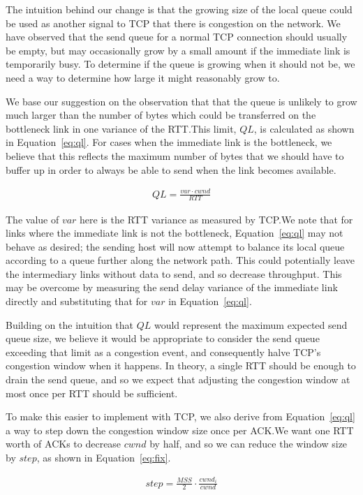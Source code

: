 The intuition behind our change is that the growing size of the local queue
could be used as another signal to TCP that there is congestion on the network.
We have observed that the send queue for a
normal TCP connection should usually be empty, but may occasionally grow by
a small amount if the immediate link is temporarily busy. To determine if the queue is
growing when it should not be, we need a way to determine how large it might
reasonably grow to.

We base our suggestion on the observation that that the queue is unlikely to
grow much larger than the number of bytes which could be transferred on the
bottleneck link in one variance of the RTT.\@ This limit, $QL$, is calculated
as shown in Equation~\ref{eq:ql}. For cases when the immediate link
is the bottleneck, we believe that this reflects the maximum number of bytes that
we should have to buffer up in order to always be able to send when the link becomes available. 

\begin{align}
  QL = \frac{var \cdot cwnd}{RTT}\label{eq:ql}
\end{align}

The value of $var$ here is the RTT
variance as measured by TCP.\@ We note that for links where the immediate link is not
the bottleneck,
Equation~\ref{eq:ql} may not behave as desired; the sending host will now
attempt to balance its local queue according to a queue further along the
network path. This could potentially leave the intermediary links without data
to send, and so decrease throughput. This may be overcome by measuring the
send delay variance
of the immediate link directly and substituting that for $var$ in
Equation~\ref{eq:ql}.

Building on the intuition that $QL$ would represent the maximum expected send
queue size, we believe it would be appropriate to consider the send queue
exceeding that limit as a congestion event, and consequently halve TCP's congestion
window when it happens. In
theory, a single RTT should be enough to drain the send queue, and so we expect
that adjusting the congestion window at most once per RTT should be sufficient.

To make this easier to implement with TCP, we also derive from Equation~\ref{eq:ql}
a way to step down the congestion window size once per ACK.\@ We want one RTT
worth of ACKs to decrease $cwnd$ by half, and so we can reduce the window size
by $step$, as shown in Equation~\ref{eq:fix}.

\begin{align}
  step = \frac{MSS}{2} \cdot \frac{cwnd_i}{cwnd}\label{eq:fix}
\end{align}


